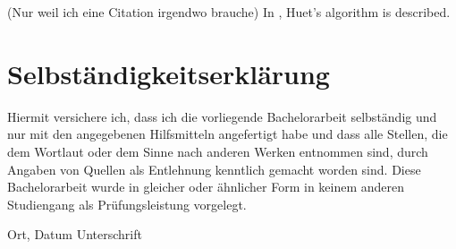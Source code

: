 \documentclass[twoside,12pt,a4paper]{article}
\begin{document}
\newpage 
(Nur weil ich eine Citation irgendwo brauche)
In \cite{DBLP:books/el/RV01/Dowek01}, Huet's algorithm is described. %








\cleardoublepage

\thispagestyle{empty}
\section*{Selbständigkeitserklärung}

Hiermit versichere ich, dass ich die vorliegende Bachelorarbeit 
selbständig und nur mit den angegebenen Hilfsmitteln angefertigt habe und dass alle Stellen, die dem Wortlaut oder dem 
Sinne nach anderen Werken entnommen sind, durch Angaben von Quellen als 
Entlehnung kenntlich gemacht worden sind. 
Diese Bachelorarbeit wurde in gleicher oder ähnlicher Form in keinem anderen 
Studiengang als Prüfungsleistung vorgelegt. 

\vskip 3cm

Ort, Datum	\hfill Unterschrift \hfill 


\end{document}
